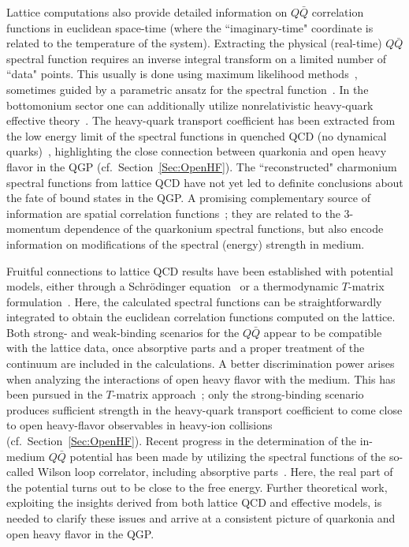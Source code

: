 Lattice computations also provide detailed information on $Q\bar Q$ correlation functions 
in euclidean space-time (where the ``imaginary-time" coordinate is related to the temperature 
of the system). Extracting the physical (real-time) $Q\bar Q$ spectral function requires an 
inverse integral transform on a limited number of ``data" points. This usually is done using 
maximum likelihood methods~\cite{Asakawa:2000tr,Aarts:2007pk}, sometimes guided by a 
parametric ansatz for the spectral function~\cite{Ding:2012sp}. In the bottomonium sector one 
can additionally utilize nonrelativistic heavy-quark effective theory~\cite{Aarts:2014cda}. 
The heavy-quark transport coefficient has been extracted from the low energy limit of the 
spectral functions in quenched QCD (no dynamical 
quarks)~\cite{Banerjee:2011ra,Ding:2012sp,Kaczmarek:2014jga}, highlighting the close connection 
between quarkonia and open heavy flavor in the QGP (cf.~Section~\ref{Sec:OpenHF}). The 
``reconstructed" charmonium spectral functions from lattice QCD have not yet led to definite
conclusions about the fate of bound states in the QGP. A promising complementary source of 
information are spatial correlation functions~\cite{Karsch:2012na,Bazavov:2014cta}; they are 
related to the 3-momentum dependence of the quarkonium spectral functions, but also encode 
information on modifications of the spectral (energy) strength in medium.   

Fruitful connections to lattice QCD results have been established with potential models, 
either through a Schr\"odinger equation~\cite{Mocsy:2005qW} or a thermodynamic $T$-matrix 
formulation~\cite{Cabrera:2006wh}. Here, the calculated  spectral functions can be 
straightforwardly integrated to obtain the euclidean correlation functions computed on the 
lattice. Both strong- and weak-binding scenarios for the $Q\bar Q$ appear to be compatible 
with the lattice data, once absorptive parts and a proper treatment of the continuum are 
included in the calculations. A better discrimination power arises when analyzing the 
interactions of open heavy flavor with the medium. This has been pursued in the $T$-matrix 
approach~\cite{Riek:2010fk}; only the strong-binding scenario produces sufficient strength 
in the heavy-quark transport coefficient to come close to open heavy-flavor observables in 
heavy-ion collisions (cf.~Section~\ref{Sec:OpenHF}).      
Recent progress in the determination of the in-medium $Q\bar Q$ potential has been made by 
utilizing the spectral functions of the so-called Wilson loop correlator, including absorptive
parts~\cite{Burnier:2014ssa}. Here, the real part of the potential turns out to be close to 
the free energy. Further theoretical work, exploiting the insights derived from both lattice QCD and 
effective models, is needed to clarify these issues and arrive at a consistent picture of 
quarkonia and open heavy flavor in the QGP.

